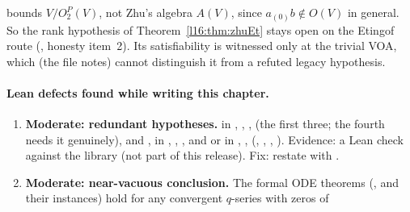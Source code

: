 \begin{warning}[title={Etingof-finiteness cannot supply Zhu's rank bound}]
 bounds $V/O_2^P(V)$, not Zhu's algebra $A(V)$, since $a_{(0)}b\notin O(V)$ in general. So the rank
hypothesis  of Theorem~\ref{l16:thm:zhuEt} stays open on the Etingof route (,
honesty item~2). Its satisfiability is witnessed only at the trivial VOA, which (the file notes) cannot distinguish it from a
refuted legacy hypothesis.
\end{warning}

\paragraph{Lean defects found while writing this chapter.}
\begin{enumerate}
\item \textbf{Moderate: redundant hypotheses.}  in \allowbreak{}\allowbreak{}\allowbreak{}\allowbreak{}\allowbreak{},
  \allowbreak{}\allowbreak{}, \allowbreak{}\allowbreak{},
  \allowbreak{}\allowbreak{} (the first three; the fourth needs it genuinely), and ,  in
  \allowbreak{}\allowbreak{}, \allowbreak{},
  \allowbreak{}\allowbreak{}\allowbreak{}\allowbreak{}\allowbreak{}, and  or  in
  \allowbreak{}\allowbreak{}, \allowbreak{}\allowbreak{},
  \allowbreak{}\allowbreak{} (,
  , , ). Evidence: a Lean check against the library (not part of this
  release). Fix: restate with \allowbreak{}\allowbreak{}.
\item \textbf{Moderate: near-vacuous conclusion.} The formal ODE theorems (\allowbreak{}\allowbreak{},
  \allowbreak{}\allowbreak{}\allowbreak{}\allowbreak{} and their instances) hold for any convergent $q$-series with zeros of

\end{enumerate}
